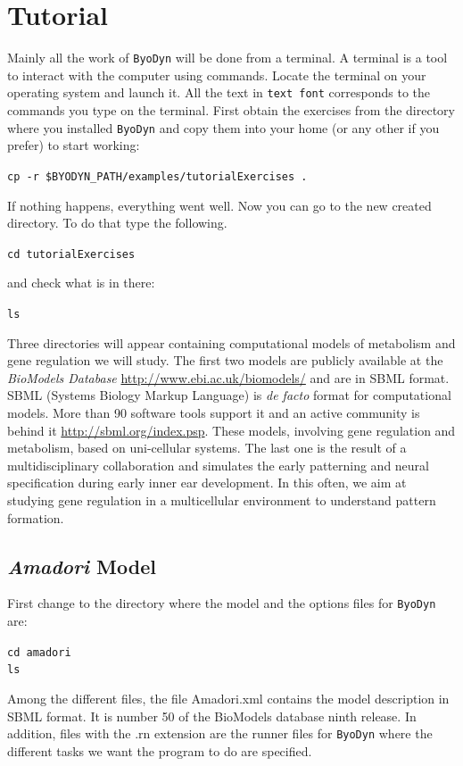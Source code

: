 \documentclass[a4paper, 11pt]{article}
\begin{document}
  \section{Tutorial}
  Mainly all the work of \texttt{ByoDyn} will be done from a terminal.
  A terminal is a tool to interact with the computer using commands.
  Locate the terminal on your operating system and launch it.
  All the text in \texttt{text font} corresponds to the commands you type on the terminal.
   First obtain the exercises from the directory where you installed \texttt{ByoDyn} and copy them into your home (or any other if you prefer) to start working:
   \begin{center}
     \texttt{cp -r \$BYODYN\_PATH/examples/tutorialExercises .}
   \end{center}
   If nothing happens, everything went well.
   Now you can go to the new created directory.
   To do that type the following.
  \begin{center}
    \texttt{cd tutorialExercises}
  \end{center}
  and check what is in there:
  \begin{center}
    \texttt{ls}
  \end{center}
  Three directories will appear containing computational  models of
  metabolism and gene regulation we will study. The first two models are
  publicly available at the \emph{BioModels Database} \url{http://www.ebi.ac.uk/biomodels/} and are in SBML format. SBML (Systems Biology Markup Language) is \textit{de facto} format for computational models.
  More than 90 software tools support it and an active community is behind it \url{http://sbml.org/index.psp}.
  These  models, involving gene regulation and metabolism, based on uni-cellular systems.
  The last one is the result of a multidisciplinary collaboration and simulates the early patterning and neural specification during early inner ear development. 
  In this often, we aim at studying gene regulation in a multicellular environment to understand pattern formation.
  \subsection{\textit{Amadori} Model}
  First change to the directory where the model and the options files for \texttt{ByoDyn} are:
  \begin{center}
    \texttt{cd amadori}\\
    \texttt{ls}
  \end{center}
  Among the different files, the file Amadori.xml contains the model description in SBML format.
  It is number 50 of the BioModels database ninth release.
  In addition, files with the .rn extension are the runner files for \texttt{ByoDyn} where the different tasks we want the program to do are specified.
\end{document}
